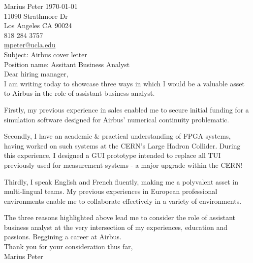 \documentclass[12pt]{article}
\begin{document}
\noindent Marius Peter \hfill \today\\
11090 Strathmore Dr\\
Los Angeles CA 90024\\
818 284 3757\\
\href{mailto:mpeter@ucla.edu}{mpeter@ucla.edu}\\[0.4cm]

\noindent Subject: Airbus cover letter\\
Position name: Assitant Business Analyst\\
\vfill
Dear hiring manager,\\[0.8cm]

I am writing today to showcase three ways in which I would be a valuable asset to Airbus in the role of assistant business analyst.

Firstly, my previous experience in sales enabled me to secure initial funding for a simulation software designed for Airbus' numerical continuity problematic.

Secondly, I have an academic \& practical understanding of FPGA systems, having worked on such systems at the CERN's Large Hadron Collider.
During this experience, I designed a GUI prototype intended to replace all TUI previously used for measurement systems - a major upgrade within the CERN!

Thirdly, I speak English and French fluently, making me a polyvalent asset in multi-lingual teams.
My previous experiences in European professional environments enable me to collaborate effectively in a variety of environments.

The three reasons highlighted above lead me to consider the role of assistant business analyst at the very intersection of my experiences, education and passions. Beggining a career at Airbus. \\[0.8cm]

Thank you for your consideration thus far,\\[0.4cm]

Marius Peter
\end{document}
